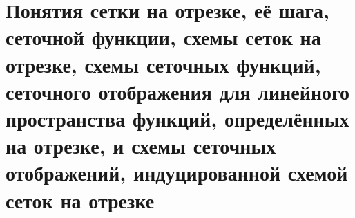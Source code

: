 \documentclass[__main__.tex]{subfiles}
\begin{document}
\section{Понятия сетки на отрезке, её шага, сеточной функции, схемы сеток на отрезке, схемы сеточных функций, сеточного отображения для линейного пространства функций, определённых на отрезке, и схемы сеточных отображений, индуцированной схемой сеток на отрезке}
\end{document}
